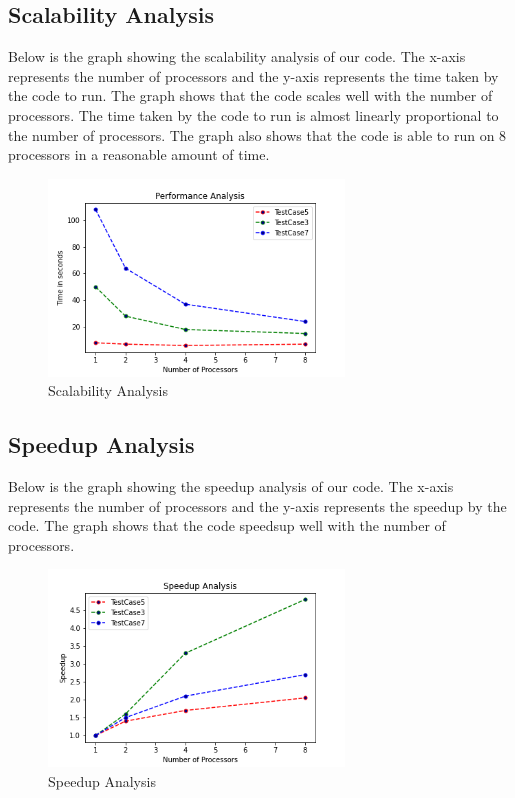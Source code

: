 \documentclass{article}
\begin{document}
\subsection{Scalability Analysis}
Below is the graph showing the scalability analysis of our code. The x-axis represents the number of processors and the y-axis represents the time taken by the code to run. The graph shows that the code scales well with the number of processors. The time taken by the code to run is almost linearly proportional to the number of processors. The graph also shows that the code is able to run on 8 processors in a reasonable amount of time. \\

\begin{figure}[H]
    \centering
    \includegraphics[width=0.7\textwidth]{ass2_1.png}
    \caption{Scalability Analysis}
    \label{fig:scalability}
\end{figure}

\subsection{Speedup Analysis}
Below is the graph showing the speedup analysis of our code. The x-axis represents the number of processors and the y-axis represents the speedup by the code. The graph shows that the code speedsup well with the number of processors.

\begin{figure}[H]
    \centering
    \includegraphics[width=0.7\textwidth]{ass2_2.png}
    \caption{Speedup Analysis}
    \label{fig:speedup}
\end{figure}
\end{document}

